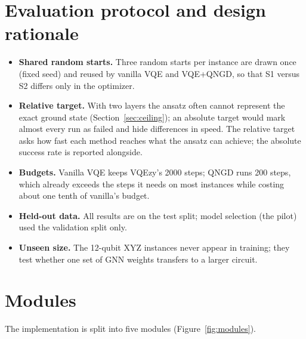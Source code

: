 \documentclass{ssnreview}
\begin{document}
\section{Evaluation protocol and design rationale}
\begin{itemize}
  \item \textbf{Shared random starts.} Three random starts per instance are drawn once (fixed
        seed) and reused by vanilla VQE and VQE+QNGD, so that S1 versus S2 differs only in the
        optimizer.
  \item \textbf{Relative target.} With two layers the ansatz often cannot represent the exact
        ground state (Section~\ref{sec:ceiling}); an absolute target would mark almost every run
        as failed and hide differences in speed. The relative target asks how fast each method
        reaches what the ansatz can achieve; the absolute success rate is reported alongside.
  \item \textbf{Budgets.} Vanilla VQE keeps VQEzy's 2000 steps; QNGD runs 200 steps, which
        already exceeds the steps it needs on most instances while costing about one tenth of
        vanilla's budget.
  \item \textbf{Held-out data.} All results are on the test split; model selection (the pilot)
        used the validation split only.
  \item \textbf{Unseen size.} The 12-qubit XYZ instances never appear in training; they test
        whether one set of GNN weights transfers to a larger circuit.
\end{itemize}

\section{Modules}

The implementation is split into five modules (Figure~\ref{fig:modules}).
\end{document}
